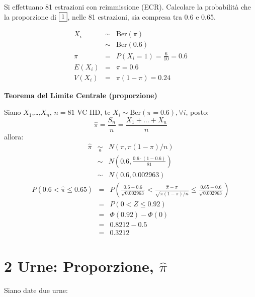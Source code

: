 \documentclass[
  11pt,
]{book}
\theoremstyle{mytheoremstyle}
\theoremstyle{mydefstyle}
\newenvironment{sol}
  {
  \begin{tcolorbox}[enhanced,breakable,arc=0.1mm,boxrule=1pt,colback=white,colframe=iblue,
  title=\bf \fontfamily{lmss}\selectfont \hspace{.5 cm} Soluzione,drop fuzzy shadow]

}{
\end{tcolorbox}
  }
\begin{document}
Si effettuano 81 estrazioni con reimmissione (ECR). Calcolare la
probabilità che la proporzione di \(\fbox{1}\), nelle 81 estrazioni, sia
compresa tra 0.6 e 0.65.

\begin{sol}
\begin{eqnarray*}
X_{i}         &\sim& \mbox{Ber}(\pi)         \\
              &\sim& \mbox{Ber}(0.6)        \\
\pi           &=& P(X_{i} = 1) = \frac{6} {10} = 0.6       \\
E(X_{i})      &=& \pi = 0.6                                \\
V(X_{i})      &=& \pi (1-\pi) = 0.24                      
\end{eqnarray*}

\textbf{Teorema del Limite Centrale (proporzione)}

Siano \(X_1\),\ldots,\(X_n\), \(n=81\) VC IID, tc \(X_i\sim\text{Ber}(\pi=0.6)\)\(,\forall i\), posto:
\[
      \hat\pi=\frac{S_n}n = \frac{X_1 + ... + X_n}n
      \]
allora:\begin{eqnarray*}
  \hat\pi & \mathop{\sim}\limits_{a}& N(\pi,\pi(1-\pi)/n) \\
  &\sim & N\left(0.6,\frac{0.6\cdot(1-0.6)}{81}\right) \\
     &\sim & N(0.6,0.002963) 
  \end{eqnarray*}\begin{eqnarray*}
   P( 0.6 < \hat\pi \leq  0.65 ) &=& P\left( \frac { 0.6  -  0.6 }{\sqrt{ 0.002963 }} < \frac { \hat\pi  -  \pi }{ \sqrt{\pi(1-\pi)/n} } \leq \frac { 0.65  -  0.6 }{\sqrt{ 0.002963 }}\right)  \\
              &=& P\left(  0  < Z \leq  0.92 \right) \\
              &=& \Phi( 0.92 )-\Phi( 0 )\\
              &=&  0.8212 - 0.5 \\ 
              &=&  0.3212 
   \end{eqnarray*}

\end{sol}

\section{\texorpdfstring{2 Urne: Proporzione, \(\widehat{\pi}\)}{2 Urne: Proporzione, \textbackslash widehat\{\textbackslash pi\}}}\label{urne-proporzione-widehatpi}

Siano date due urne:
\end{document}
